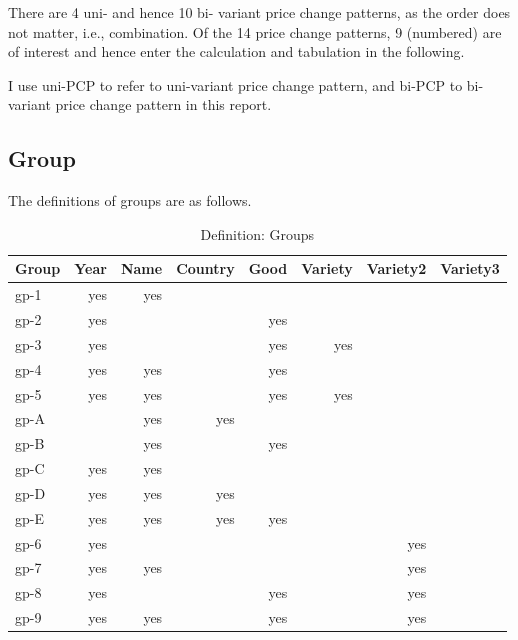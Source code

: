There are 4 uni- and hence 10 bi- variant price change patterns, as the order does not matter, i.e., combination. Of the 14 price change patterns, 9 (numbered) are of interest and hence enter the calculation and tabulation in the following.

I use uni-PCP to refer to uni-variant price change pattern, and bi-PCP to bi-variant price change pattern in this report.

\subsection{Group}

The definitions of groups are as follows.

\begin{table}[H]
	\caption{Definition: Groups}
	\begin{tabular}{l|rrrrrrr}
		\hline\hline
		Group & Year & Name & Country & Good & Variety & Variety2 & Variety3 \\ \hline\hline
		gp-1  &  yes &  yes &         &      &         &          &          \\
		gp-2  &  yes &      &         &  yes &         &          &          \\
		gp-3  &  yes &      &         &  yes &     yes &          &          \\
		gp-4  &  yes &  yes &         &  yes &         &          &          \\
		gp-5  &  yes &  yes &         &  yes &     yes &          &          \\ \hline\hline
		gp-A  &      &  yes &     yes &      &         &          &          \\
		gp-B  &      &  yes &         &  yes &         &          &          \\
		gp-C  &  yes &  yes &         &      &         &          &          \\
		gp-D  &  yes &  yes &     yes &      &         &          &          \\
		gp-E  &  yes &  yes &     yes &  yes &         &          &          \\ \hline\hline
		gp-6  &  yes &      &         &      &         &      yes &          \\
		gp-7  &  yes &  yes &         &      &         &      yes &          \\
		gp-8  &  yes &      &         &  yes &         &      yes &          \\
		gp-9  &  yes &  yes &         &  yes &         &      yes &          \\ \hline

\end{tabular}
\end{table}
